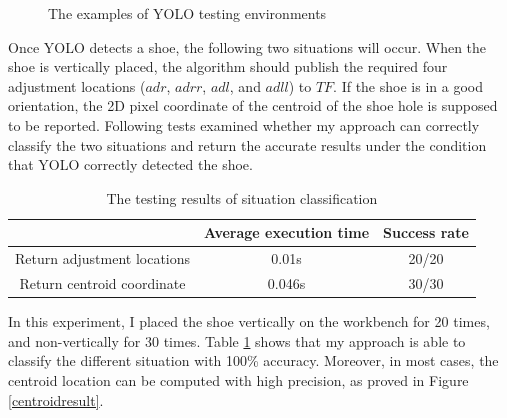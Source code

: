 \begin{figure}[H]
\centering
{}
\caption{The examples of YOLO testing environments}
\end{figure}

Once YOLO detects a shoe, the following two situations will occur. When the shoe is vertically placed, the algorithm should publish the required four adjustment locations ($adr$, $adrr$, $adl$, and $adll$) to $TF$. If the shoe is in a good orientation, the 2D pixel coordinate of the centroid of the shoe hole is supposed to be reported. Following tests examined whether my approach can correctly classify the two situations and return the accurate results under the condition that YOLO correctly detected the shoe.

\begin{table}[H]
\centering
\begin{tabular}{||c||c|c||}
\hline
 & Average execution time & Success rate \\ \hline \hline
Return adjustment locations & 0.01s & 20/20 \\ \hline
Return centroid coordinate & 0.046s & 30/30 \\ \hline
\end{tabular}
\caption{The testing results of situation classification}
\label{locationtest}
\end{table}

In this experiment, I placed the shoe vertically on the workbench for 20 times, and non-vertically for 30 times. Table \ref{locationtest} shows that my approach is able to classify the different situation with 100\% accuracy. Moreover, in most cases, the centroid location can be computed with high precision, as proved in Figure \ref{centroidresult}. 

